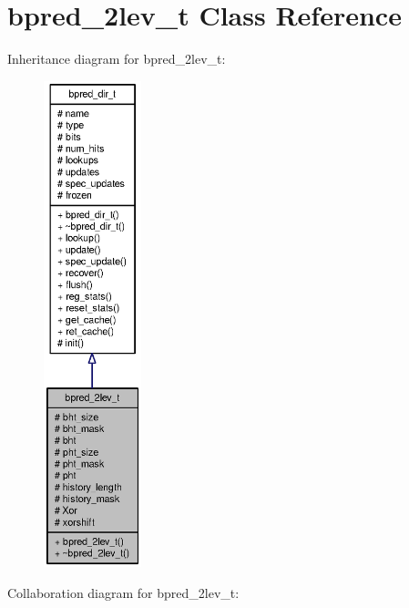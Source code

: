 \section{bpred\_\-2lev\_\-t Class Reference}
\label{classbpred__2lev__t}
Inheritance diagram for bpred\_\-2lev\_\-t:\nopagebreak
\begin{figure}[H]
\begin{center}
\leavevmode
\includegraphics[height=400pt]{classbpred__2lev__t__inherit__graph}
\end{center}
\end{figure}
Collaboration diagram for bpred\_\-2lev\_\-t:\nopagebreak

